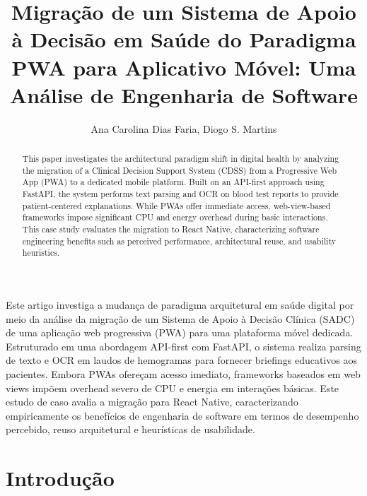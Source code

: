 \documentclass[12pt]{article}
\title{Migração de um Sistema de Apoio à Decisão em Saúde do Paradigma PWA para Aplicativo Móvel: Uma Análise de Engenharia de Software}
\author{Ana Carolina Dias Faria\inst{1}, Diogo S. Martins\inst{1}}
\begin{document}
\maketitle

\begin{abstract}
  This paper investigates the architectural paradigm shift in digital health by analyzing the migration of a Clinical Decision Support System (CDSS) from a Progressive Web App (PWA) to a dedicated mobile platform. Built on an API-first approach using FastAPI, the system performs text parsing and OCR on blood test reports to provide patient-centered explanations. While PWAs offer immediate access, web-view-based frameworks impose significant CPU and energy overhead during basic interactions. This case study evaluates the migration to React Native, characterizing software engineering benefits such as perceived performance, architectural reuse, and usability heuristics.
\end{abstract}

\begin{resumo}
  Este artigo investiga a mudança de paradigma arquitetural em saúde digital por meio da análise da migração de um Sistema de Apoio à Decisão Clínica (SADC) de uma aplicação web progressiva (PWA) para uma plataforma móvel dedicada. Estruturado em uma abordagem API-first com FastAPI, o sistema realiza parsing de texto e OCR em laudos de hemogramas para fornecer briefings educativos aos pacientes. Embora PWAs ofereçam acesso imediato, frameworks baseados em web views impõem overhead severo de CPU e energia em interações básicas. Este estudo de caso avalia a migração para React Native, caracterizando empiricamente os benefícios de engenharia de software em termos de desempenho percebido, reuso arquitetural e heurísticas de usabilidade.
\end{resumo}

\section{Introdução}
\end{document}
